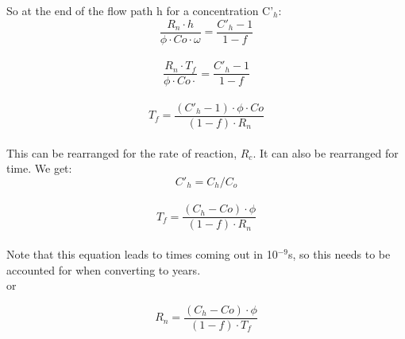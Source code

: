 So at the end of the flow path h for a concentration C'$_h$:\\

\begin{equation}
    \frac{R_n\cdot h}{\phi\cdot Co \cdot \omega}  = \frac{C'_h - 1}{1-f}
\end{equation}\\

\begin{equation}
    \frac{R_n\cdot T_f}{\phi\cdot Co \cdot}  = \frac{C'_h - 1}{1-f}
\end{equation}\\

\begin{equation}
    T_f  = \frac{\left(C'_h - 1\right)\cdot\phi\cdot Co}{\left(1-f\right)\cdot R_n}
\end{equation}\\

This can be rearranged for the rate of reaction, $R_c$. It can also be rearranged for time. We get:\\



\begin{equation}
    C'_h = C_h/C_o
\end{equation}\\


\begin{equation}
    T_f  = \frac{\left(C_h - Co\right)\cdot\phi}{\left(1-f\right)\cdot R_n}
\end{equation}\\

Note that this equation leads to times coming out in 10$^{-9}$s, so this needs to be accounted for when converting to years.\\

or

\begin{equation}
    R_n  = \frac{\left(C_h - Co\right)\cdot\phi}{\left(1-f\right)\cdot T_f}
\end{equation}\\

\FloatBarrier
\newpage

